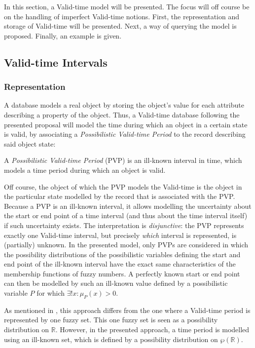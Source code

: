 In this section, a Valid-time model will be presented. The focus will off course be on the handling of imperfect Valid-time notions. First, the representation and storage of Valid-time will be presented. Next, a way of querying the model is proposed. Finally, an example is given.

\subsection{Valid-time Intervals}
\subsubsection{Representation}
\label{subsec:representation-ill-known}
A database models a real object by storing the object's value for each attribute describing a property of the object. Thus, a Valid-time database following the presented proposal will model the time during which an object in a certain state is valid, by associating a \emph{Possibilistic Valid-time Period} to the record describing said object state:

\begin{definition}
A \emph{Possibilistic Valid-time Period} (PVP) is an ill-known interval in time, which models a time period during which an object is valid.
\end{definition}

Off course, the object of which the PVP models the Valid-time is the object in the particular state modelled by the record that is associated with the PVP. Because a PVP is an ill-known interval, it allows modelling the uncertainty about the start or end point of a time interval (and thus about the time interval itself) if such uncertainty exists. The interpretation is \emph{disjunctive}: the PVP represents exactly one Valid-time interval, but precisely \emph{which} interval is represented, is (partially) unknown. In the presented model, only PVPs are considered in which the possibility distributions of the possibilistic variables defining the start and end point of the ill-known interval have the exact same characteristics of the membership functions of fuzzy numbers. A perfectly known start or end point can then be modelled by such an ill-known value defined by a possibilistic variable $P$ for which $\exists ! x : \mu_{P}(x) > 0$.

As mentioned in \cite{Pon11}, this approach differs from the one where a Valid-time period is represented by one fuzzy set. This one fuzzy set is seen as a possibility distribution on $\mathbb{R}$. However, in the presented approach, a time period is modelled using an ill-known set, which is defined by a possibility distribution on $\wp(\mathbb{R})$.



